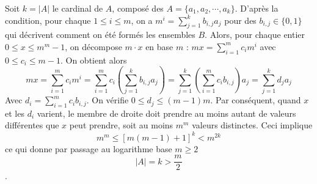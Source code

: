 \begin{sol}
Soit $k = |A|$ le cardinal de $A$, composé des $A = \{a_1, a_2, \cdots, a_k\}$. D'après la condition, pour chaque $1 \le i \le m$, on a $m^i = \displaystyle\sum_{j = 1}^kb_{i, j}a_j$ pour des $b_{i, j} \in \{0, 1\}$ qui décrivent comment on été formés les ensembles $B$. Alors, pour chaque entier $0 \le x \le m^m - 1$, on décompose $m\cdot x$ en base $m$ : $mx = \displaystyle\sum_{i = 1}^mc_im^i$ avec $0 \le c_i \le m - 1$. On obtient alors
$$mx = \displaystyle\sum_{i = 1}^mc_im^i = \displaystyle\sum_{i = 1}^mc_i\left(\displaystyle\sum_{j = 1}^kb_{i, j}a_j\right) = \displaystyle\sum_{j = 1}^k\left(\displaystyle\sum_{i = 1}^mc_ib_{i, j}\right)a_j = \displaystyle\sum_{j = 1}^kd_ja_j$$
Avec $d_i = \displaystyle\sum_{i = 1}^mc_ib_{i, j}$. On vérifie $0 \le d_j \le (m - 1)m$. Par conséquent, quand $x$ et les $d_i$ varient, le membre de droite doit prendre au moins autant de valeurs différentes que $x$ peut prendre, soit au moins $m^m$ valeurs distinctes. Ceci implique $$m^m \le [m(m - 1) + 1]^k < m^{2k}$$ ce qui donne par passage au logarithme base $m\ge2$ $$|A| = k > \frac m2$$.
\end{sol}
